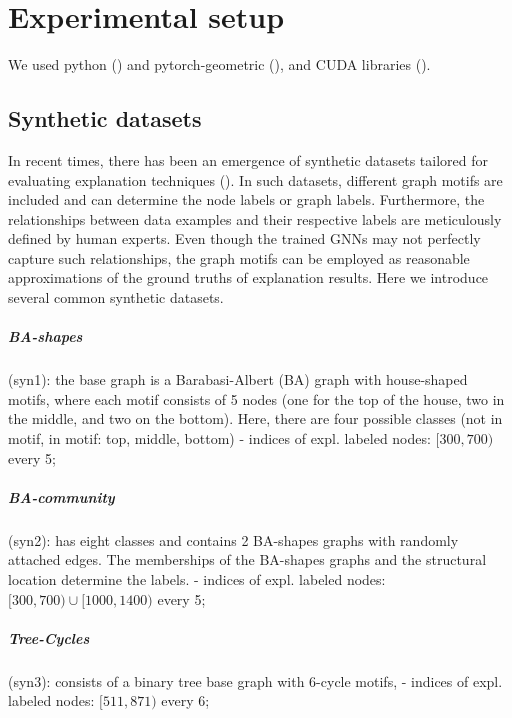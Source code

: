 \documentclass[binding=0.6cm]{sapthesis}
\newcommand{\mycite}[1]{(\cite{#1})}
\begin{document}
\chapter{Experimental setup}
\label{chap:4-expRes}
We used python \mycite{vanRossum2009-python} and pytorch-geometric \mycite{fey2019-PyG}, and CUDA libraries \mycite{cudaToolkit}.

\section{Synthetic datasets}
\label{sec:expRes.syns-dataset}
In recent times, there has been an emergence of synthetic datasets tailored for evaluating explanation techniques (\cite{ying2019-gnnexplainer,luo2020-pgexplainer}). In such datasets, different graph motifs are included and can determine the node labels or graph labels. Furthermore, the relationships between data examples and their respective labels are meticulously defined by human experts. Even though the trained GNNs may not perfectly capture such relationships, the graph motifs can be employed as reasonable approximations of the ground truths of explanation results. Here we introduce several common synthetic datasets.

\paragraph{BA-shapes}
(syn1): the base graph is a Barabasi-Albert (BA) graph with house-shaped motifs, where each motif consists of 5 nodes (one for the top of the house, two in the middle, and two on the bottom). Here, there are four possible classes (not in motif, in motif: top, middle, bottom)  - indices of expl. labeled nodes: $[300,700)$ every 5;

\paragraph{BA-community}
(syn2): has eight classes and contains 2 BA-shapes graphs with randomly attached edges. The memberships of the BA-shapes graphs and the structural location determine the labels.  - indices of expl. labeled nodes: $[300,700) \cup [1000,1400)$ every 5; 

\paragraph{Tree-Cycles}
(syn3): consists of a binary tree base graph with 6-cycle motifs,  - indices of expl. labeled nodes: $[511,871)$ every 6;
\end{document}
